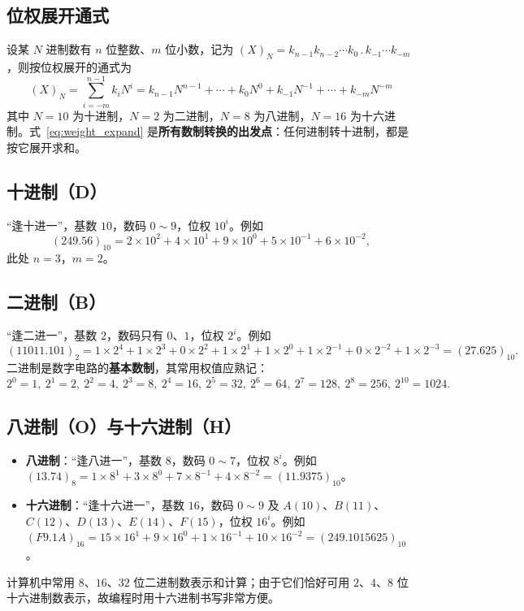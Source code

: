 \subsection{位权展开通式}
设某 $N$ 进制数有 $n$ 位整数、$m$ 位小数，记为 $(X)_N=k_{n-1}k_{n-2}\cdots k_0\,.\,k_{-1}\cdots k_{-m}$，则按位权展开的通式为
\begin{equation}
\boxed{\;(X)_N=\sum_{i=-m}^{n-1} k_i N^i
= k_{n-1}N^{n-1}+\cdots+k_0N^0+k_{-1}N^{-1}+\cdots+k_{-m}N^{-m}\;}
\label{eq:weight_expand}
\end{equation}
其中 $N=10$ 为十进制，$N=2$ 为二进制，$N=8$ 为八进制，$N=16$ 为十六进制。式~\eqref{eq:weight_expand} 是\textbf{所有数制转换的出发点}：任何进制转十进制，都是按它展开求和。

\subsection{十进制（D）}
``逢十进一''，基数 $10$，数码 $0\sim9$，位权 $10^i$。例如
\[
(249.56)_{10}=2\times10^2+4\times10^1+9\times10^0+5\times10^{-1}+6\times10^{-2},
\]
此处 $n=3$，$m=2$。

\subsection{二进制（B）}
``逢二进一''，基数 $2$，数码只有 $0$、$1$，位权 $2^i$。例如
\[
(11011.101)_2=1\times2^4+1\times2^3+0\times2^2+1\times2^1+1\times2^0+1\times2^{-1}+0\times2^{-2}+1\times2^{-3}=(27.625)_{10}.
\]
二进制是数字电路的\textbf{基本数制}，其常用权值应熟记：
\[
2^0=1,\ 2^1=2,\ 2^2=4,\ 2^3=8,\ 2^4=16,\ 2^5=32,\ 2^6=64,\ 2^7=128,\ 2^8=256,\ 2^{10}=1024.
\]

\subsection{八进制（O）与十六进制（H）}
\begin{itemize}
    \item \textbf{八进制}：``逢八进一''，基数 $8$，数码 $0\sim7$，位权 $8^i$。例如 $(13.74)_8=1\times8^1+3\times8^0+7\times8^{-1}+4\times8^{-2}=(11.9375)_{10}$。
    \item \textbf{十六进制}：``逢十六进一''，基数 $16$，数码 $0\sim9$ 及 $A(10)$、$B(11)$、$C(12)$、$D(13)$、$E(14)$、$F(15)$，位权 $16^i$。例如 $(F9.1A)_{16}=15\times16^1+9\times16^0+1\times16^{-1}+10\times16^{-2}=(249.1015625)_{10}$。
\end{itemize}

计算机中常用 $8$、$16$、$32$ 位二进制数表示和计算；由于它们恰好可用 $2$、$4$、$8$ 位十六进制数表示，故编程时用十六进制书写非常方便。

